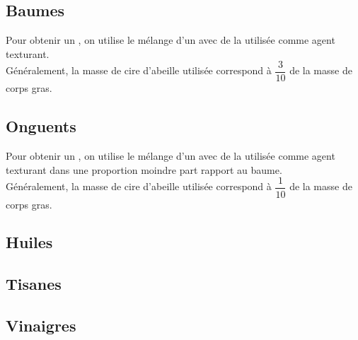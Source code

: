 \label{baume}
\subsection{Baumes}

    \begin{Defi}[Baume]
        Pour obtenir un , on utilise le mélange d'un  avec de la  utilisée comme agent texturant.\\

        Généralement, la masse de cire d'abeille utilisée correspond à $\dfrac{3}{10}$ de la masse de corps gras. 
    \end{Defi}


    
    \newpage
    
\newpage
\label{onguent}
\subsection{Onguents}

    \begin{Defi}[Onguent]
        Pour obtenir un , on utilise le mélange d'un  avec de la  utilisée comme agent texturant dans une proportion moindre part rapport au baume.\\

        Généralement, la masse de cire d'abeille utilisée correspond à $\dfrac{1}{10}$ de la masse de corps gras. 
    \end{Defi}

    
    \newpage
    
\newpage
\subsection{Huiles}
\newpage
\subsection{Tisanes}

    

\newpage
\subsection{Vinaigres}

    
